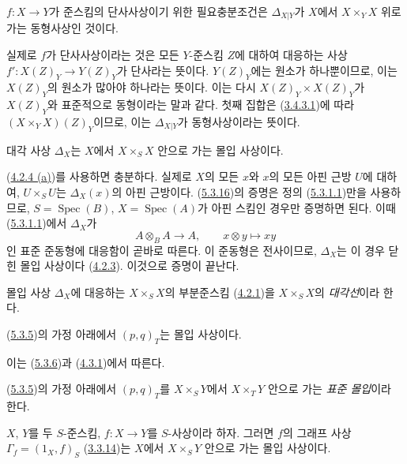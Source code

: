 \begin{proposition}[5.3.8]
\label{I.5.3.8-ko}
$f:X\to Y$가 준스킴의 단사사상이기 위한 필요충분조건은
$\Delta_{X|Y}$가 $X$에서 $X\times_Y X$ 위로 가는 동형사상인 것이다.
\end{proposition}

실제로 $f$가 단사사상이라는 것은 모든 $Y$-준스킴 $Z$에 대하여
대응하는 사상 $f':X(Z)_Y\to Y(Z)_Y$가 단사라는 뜻이다.
$Y(Z)_Y$에는 원소가 하나뿐이므로, 이는 $X(Z)_Y$의 원소가 많아야
하나라는 뜻이다. 이는 다시 $X(Z)_Y\times X(Z)_Y$가
$X(Z)_Y$와 표준적으로 동형이라는 말과 같다. 첫째 집합은
(\hyperref[I.3.4.3.1-ko]{3.4.3.1})에 따라
$(X\times_Y X)(Z)_Y$이므로, 이는 $\Delta_{X|Y}$가 동형사상이라는
뜻이다.

\begin{proposition}[5.3.9]
\label{I.5.3.9-ko}
대각 사상 $\Delta_X$는 $X$에서 $X\times_S X$ 안으로 가는 몰입
사상이다.
\end{proposition}

(\hyperref[I.4.2.4-ko]{4.2.4 (a)})를 사용하면 충분하다. 실제로
$X$의 모든 $x$와 $x$의 모든 아핀 근방 $U$에 대하여,
$U\times_S U$는 $\Delta_X(x)$의 아핀 근방이다.
(\hyperref[I.5.3.16-ko]{5.3.16})의 증명은 정의
(\hyperref[I.5.3.1.1-ko]{5.3.1.1})만을 사용하므로, $S=\operatorname{Spec}(B)$,
$X=\operatorname{Spec}(A)$가 아핀 스킴인 경우만 증명하면 된다. 이때
(\hyperref[I.5.3.1.1-ko]{5.3.1.1})에서 $\Delta_X$가
\[
A\otimes_B A\longrightarrow A,\qquad x\otimes y\longmapsto xy
\]
인 표준 준동형에 대응함이 곧바로 따른다. 이 준동형은 전사이므로,
$\Delta_X$는 이 경우 닫힌 몰입 사상이다
(\hyperref[I.4.2.3-ko]{4.2.3}). 이것으로 증명이 끝난다.

몰입 사상 $\Delta_X$에 대응하는 $X\times_S X$의 부분준스킴
(\hyperref[I.4.2.1-ko]{4.2.1})을 $X\times_S X$의
\emph{대각선}이라 한다.

\begin{corollary}[5.3.10]
\label{I.5.3.10-ko}
(\hyperref[I.5.3.5-ko]{5.3.5})의 가정 아래에서 $(p,q)_T$는 몰입
사상이다.
\end{corollary}

이는 (\hyperref[I.5.3.6-ko]{5.3.6})과
(\hyperref[I.4.3.1-ko]{4.3.1})에서 따른다.

(\hyperref[I.5.3.5-ko]{5.3.5})의 가정 아래에서 $(p,q)_T$를
$X\times_S Y$에서 $X\times_T Y$ 안으로 가는 \emph{표준 몰입}이라
한다.

\begin{corollary}[5.3.11]
\label{I.5.3.11-ko}
$X$, $Y$를 두 $S$-준스킴, $f:X\to Y$를 $S$-사상이라 하자. 그러면
$f$의 그래프 사상 $\Gamma_f=(1_X,f)_S$
(\hyperref[I.3.3.14-ko]{3.3.14})는 $X$에서 $X\times_S Y$ 안으로 가는
몰입 사상이다.
\end{corollary}

